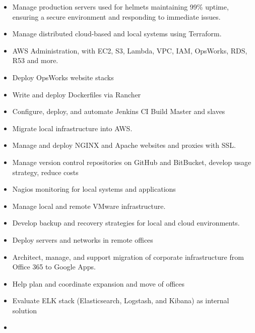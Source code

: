 \documentclass[]{article}
\providecommand{\tightlist}{%
  \setlength{\itemsep}{0pt}\setlength{\parskip}{0pt}}
\begin{document}
\begin{itemize}
\tightlist
\item
  Manage production servers used for helmets maintaining 99\% uptime,
  ensuring a secure environment and responding to immediate issues.\\
\item
  Manage distributed cloud-based and local systems using Terraform.\\
\item
  AWS Administration, with EC2, S3, Lambda, VPC, IAM, OpsWorks, RDS, R53
  and more.\\
\item
  Deploy OpsWorks website stacks\\
\item
  Write and deploy Dockerfiles via Rancher\\
\item
  Configure, deploy, and automate Jenkins CI Build Master and slaves\\
\item
  Migrate local infrastructure into AWS.\\
\item
  Manage and deploy NGINX and Apache websites and proxies with SSL.\\
\item
  Manage version control repositories on GitHub and BitBucket, develop
  usage strategy, reduce costs\\
\item
  Nagios monitoring for local systems and applications\\
\item
  Manage local and remote VMware infrastructure.\\
\item
  Develop backup and recovery strategies for local and cloud
  environments.\\
\item
  Deploy servers and networks in remote offices\\
\item
  Architect, manage, and support migration of corporate infrastructure
  from Office 365 to Google Apps.\\
\item
  Help plan and coordinate expansion and move of offices\\
\item
  Evaluate ELK stack (Elasticsearch, Logstash, and Kibana) as internal
  solution\\
\item

\end{itemize}
\end{document}
